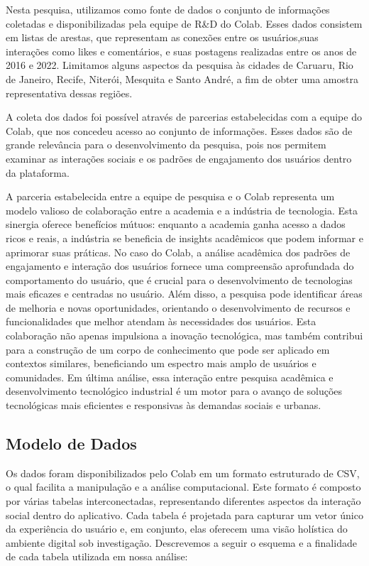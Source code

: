 Nesta pesquisa, utilizamos como fonte de dados o conjunto de informações coletadas e disponibilizadas pela equipe de R\&D do Colab. Esses dados consistem em listas de arestas, que representam as conexões entre os usuários,suas interações como likes e comentários, e suas postagens realizadas entre os anos de 2016 e 2022. Limitamos alguns aspectos da pesquisa às cidades de Caruaru, Rio de Janeiro, Recife, Niterói, Mesquita e Santo André, a fim de obter uma amostra representativa dessas regiões.

A coleta dos dados foi possível através de parcerias estabelecidas com a equipe do Colab, que nos concedeu acesso ao conjunto de informações. Esses dados são de grande relevância para o desenvolvimento da pesquisa, pois nos permitem examinar as interações sociais e os padrões de engajamento dos usuários dentro da plataforma.

A parceria estabelecida entre a equipe de pesquisa e o Colab representa um modelo valioso de colaboração entre a academia e a indústria de tecnologia. Esta sinergia oferece benefícios mútuos: enquanto a academia ganha acesso a dados ricos e reais, a indústria se beneficia de insights acadêmicos que podem informar e aprimorar suas práticas. No caso do Colab, a análise acadêmica dos padrões de engajamento e interação dos usuários fornece uma compreensão aprofundada do comportamento do usuário, que é crucial para o desenvolvimento de tecnologias mais eficazes e centradas no usuário. Além disso, a pesquisa pode identificar áreas de melhoria e novas oportunidades, orientando o desenvolvimento de recursos e funcionalidades que melhor atendam às necessidades dos usuários. Esta colaboração não apenas impulsiona a inovação tecnológica, mas também contribui para a construção de um corpo de conhecimento que pode ser aplicado em contextos similares, beneficiando um espectro mais amplo de usuários e comunidades. Em última análise, essa interação entre pesquisa acadêmica e desenvolvimento tecnológico industrial é um motor para o avanço de soluções tecnológicas mais eficientes e responsivas às demandas sociais e urbanas.

\subsection*{Modelo de Dados}
\label{sec:modelo_de_dados}

Os dados foram disponibilizados pelo Colab em um formato estruturado de CSV, o qual facilita a manipulação e a análise computacional. Este formato é composto por várias tabelas interconectadas, representando diferentes aspectos da interação social dentro do aplicativo. Cada tabela é projetada para capturar um vetor único da experiência do usuário e, em conjunto, elas oferecem uma visão holística do ambiente digital sob investigação. Descrevemos a seguir o esquema e a finalidade de cada tabela utilizada em nossa análise:


